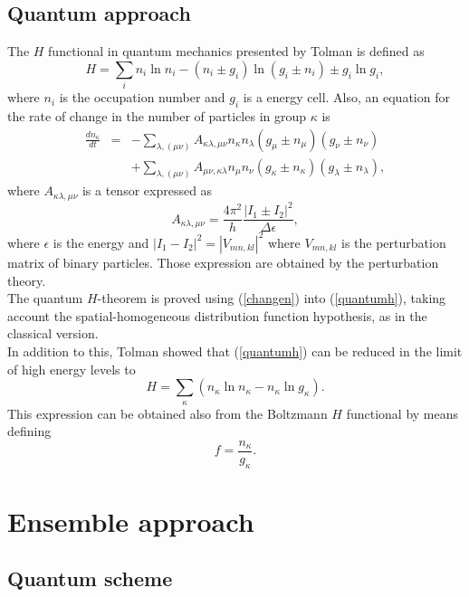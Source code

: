 \documentclass{article}
\begin{document}
\subsection{Quantum approach}
The $H$ functional in quantum mechanics presented by Tolman \cite{tolman} is defined as 
\begin{equation}
    H=\sum_i n_i \ln n_i -(n_i\pm g_i)\ln (g_i \pm n_i)\pm g_i\ln g_i, \label{quantumh}
\end{equation}
where $n_i$ is the occupation number and $g_i$ is a energy cell. Also, an equation for the rate of change in the number of particles in group $\kappa$ is
\begin{eqnarray}
    \frac{d n_{\kappa}}{dt}&=&-\sum_{\lambda,(\mu \nu)}A_{\kappa\lambda,\mu\nu} n_{\kappa}n_{\lambda}(g_{\mu}\pm n_{\mu})(g_{\nu}\pm n_{\nu})\nonumber \\
    &&+\sum_{\lambda,(\mu \nu)}A_{\mu\nu,\kappa\lambda} n_{\mu}n_{\nu}(g_{\kappa}\pm n_{\kappa})(g_{\lambda}\pm n_{\lambda}),\label{changen}
\end{eqnarray}
where $A_{\kappa\lambda,\mu\nu}$ is a tensor expressed as
\begin{equation}
  A_{\kappa\lambda,\mu\nu}=\frac{4\pi^{2}}{h}\frac{|I_1\pm I_2|^2}{\Delta \epsilon},
\end{equation}
where $\epsilon$ is the energy and $|I_1-I_2|^2=|V_{mn,kl}|^2$ where $V_{mn,kl}$ is the perturbation matrix of binary particles. Those expression are obtained by the perturbation theory.\\
The quantum $H$-theorem is proved using (\ref{changen}) into (\ref{quantumh}), taking account the spatial-homogeneous distribution function hypothesis, as in the classical version.\\
In addition to this, Tolman showed that (\ref{quantumh}) can be reduced in the limit of high energy levels to
\begin{equation}
    H = \sum_{\kappa} (n_{\kappa} \ln n_{\kappa} - n_{\kappa} \ln g_{\kappa}). \label{reduce-h}
\end{equation}
This expression can be obtained also from the Boltzmann $H$ functional by means defining 
\begin{equation}
    f=\frac{n_{\kappa}}{ g_{\kappa}}.
\end{equation}
\section{Ensemble approach}
\subsection{Quantum scheme}
\end{document}
